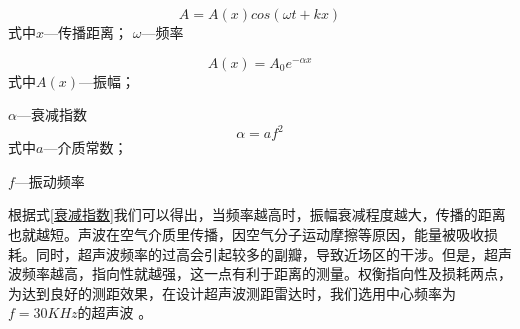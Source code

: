     \begin{equation}
    	A=A(x)cos(\omega t+kx)
    	\label{波动方程}
    \end{equation}
	式中\quad$x$---传播距离；
	\quad$\omega$---频率

	\begin{equation}
		A(x)=A_0 e^{-\alpha x}
		\label{振幅方程}
	\end{equation}
	式中\quad$A(x)$---振幅；\par
		\quad$\alpha$---衰减指数
	\begin{equation}
		\alpha=a f^2
		\label{衰减指数}
	\end{equation}
	式中\quad $a$---介质常数；\par
	   \quad $f$---振动频率\par
    根据式\ref{衰减指数}我们可以得出，当频率越高时，振幅衰减程度越大，传播的距离也就越短。声波在空气介质里传播，因空气分子运动摩擦等原因，能量被吸收损耗。同时，超声波频率的过高会引起较多的副瓣，导致近场区的干涉。但是，超声波频率越高，指向性就越强，这一点有利于距离的测量。权衡指向性及损耗两点，为达到良好的测距效果，在设计超声波测距雷达时，我们选用中心频率为$f=30KHz$的超声波 。
